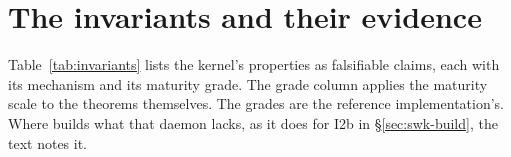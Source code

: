 \documentclass[11pt,a4paper]{article}
\theoremstyle{definition}
\theoremstyle{remark}
\begin{document}
\section{The invariants and their evidence}
\label{sec:invariants}

Table~\ref{tab:invariants} lists the kernel's properties as falsifiable claims,
each with its mechanism and its maturity grade. The grade column applies the
maturity scale to the theorems themselves. The grades are the reference
implementation's. Where \pdkernelname{} builds what that daemon lacks, as it
does for I2b in \S\ref{sec:swk-build}, the text notes it.

\renewcommand{\arraystretch}{1.2}
\end{document}
